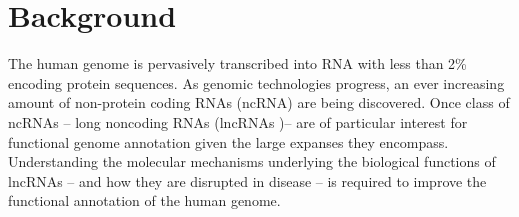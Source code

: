 \documentclass{bmcart}
\begin{document}
\begin{frontmatter}
\begin{abstractbox}

\begin{keyword}
\end{keyword}


\end{abstractbox}
%

\end{frontmatter}





\section*{Background}
The human genome is pervasively transcribed into RNA with less than 2\%
encoding protein sequences. As genomic technologies progress, an ever 
increasing amount of non-protein coding RNAs (ncRNA) are being discovered.
Once class of ncRNAs -- long noncoding RNAs (lncRNAs )-- are of particular 
interest for functional genome annotation given the large expanses they encompass. 
Understanding the molecular mechanisms underlying the biological functions of 
lncRNAs -- and how they are disrupted in disease -- is required to improve 
the functional annotation of the human genome. \\
\end{document}
